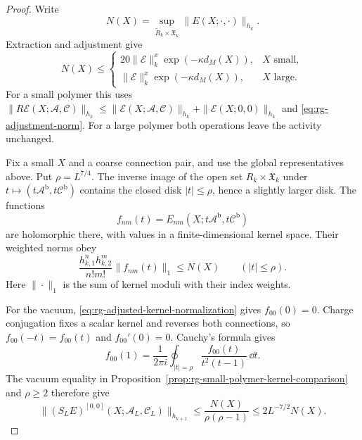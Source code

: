 \begin{proof}
Write
\[
 N(X)=\sup_{\widetilde R_k\times\mathfrak X_k}
                                      \|E(X;\cdot,\cdot)\|_{h_k}.
\]
Extraction and adjustment give
\begin{equation}\label{eq:rg-adjusted-polymer-bound}
 N(X)\le
 \begin{cases}
 20\|\mathscr E\|_k^x\exp(-\kappa d_M(X)),&X\text{ small},\\
 \|\mathscr E\|_k^x\exp(-\kappa d_M(X)),&X\text{ large}.
 \end{cases}
\end{equation}
For a small polymer this uses
$\|R\mathscr E(X;\mathscr A,\mathscr C)\|_{h_k}
\le\|\mathscr E(X;\mathscr A,\mathscr C)\|_{h_k}
 +\|\mathscr E(X;0,0)\|_{h_k}$ and
\eqref{eq:rg-adjustment-norm}. For a large polymer both
operations leave the activity unchanged.

Fix a small $X$ and a coarse connection pair, and use
the global representatives above. Put $\rho=L^{7/4}$.
The inverse image of the open set $R_k\times\mathfrak X_k$
under $t\mapsto(t\mathscr A^{\mathrm b},t\mathscr C^{\mathrm b})$
contains the closed disk $|t|\le\rho$, hence a slightly
larger disk. The functions
\[
 f_{nm}(t)=E_{nm}(X;t\mathscr A^{\mathrm b},
                              t\mathscr C^{\mathrm b})
\]
are holomorphic there, with values in a finite-dimensional
kernel space. Their weighted norms obey
\[
 \frac{h_{k,1}^nh_{k,2}^m}{n!m!}\|f_{nm}(t)\|_1
                                      \le N(X)\qquad(|t|\le\rho).
\]
Here $\|\cdot\|_1$ is the sum of kernel moduli with their
index weights.

For the vacuum, \eqref{eq:rg-adjusted-kernel-normalization}
gives $f_{00}(0)=0$. Charge conjugation fixes a scalar
kernel and reverses both connections, so
$f_{00}(-t)=f_{00}(t)$ and $f_{00}'(0)=0$.
Cauchy's formula gives
\[
 f_{00}(1)=\frac1{2\pi i}\oint_{|t|=\rho}
                                   \frac{f_{00}(t)}{t^2(t-1)}\,\dd t.
\]
The vacuum equality in
Proposition~\ref{prop:rg-small-polymer-kernel-comparison}
and $\rho\ge2$ therefore give
\begin{equation}\label{eq:rg-vacuum-cauchy-gain}
 \|(S_LE)^{[0,0]}(X;\mathscr A_L,\mathscr C_L)\|_{h_{k+1}}
              \le\frac{N(X)}{\rho(\rho-1)}
              \le2L^{-7/2}N(X).
\end{equation}


\end{proof}

